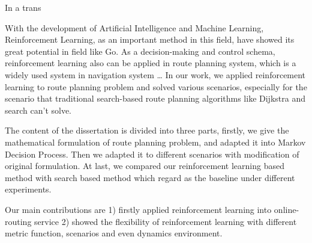 \documentclass{standalone}
\begin{document}
\begin{englishabstract}

	In a trans 

    With the development of Artificial Intelligence and Machine Learning, Reinforcement Learning, as an important method in this field, have showed its great potential in field like Go. As a decision-making and control schema, reinforcement learning also can be applied in route planning system, which is a widely used system in navigation system … In our work, we applied reinforcement learning to route planning problem and solved various scenarios, especially for the scenario that traditional search-based route planning algorithms like Dijkstra and  search can’t solve. 
    
    The content of the dissertation is divided into three parts, firstly, we give the mathematical formulation of route planning problem, and adapted it into Markov Decision Process. Then we adapted it to different scenarios with modification of original formulation. At last, we compared our reinforcement learning based method with search based method which regard as the baseline under different experiments.
    
    Our main contributions are 1) firstly applied reinforcement learning into online-routing service 2) showed the flexibility of reinforcement learning with different metric function, scenarios and even dynamics environment.

\end{englishabstract}
\end{document}
